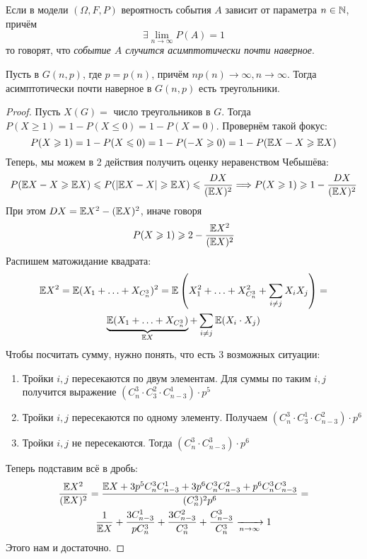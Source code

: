 \begin{definition}
	Если в модели $(\Omega, F, P)$ вероятность события $A$ зависит от параметра $n \in \mathbb{N}$, причём
	\[
		\exists \lim_{n \to \infty} P(A) = 1
	\]
	то говорят, что \textit{событие $A$ случится асимптотически почти наверное}.
\end{definition}

\begin{theorem}
	Пусть в $G(n, p)$, где $p = p(n)$, причём $np(n) \to \infty, n \to \infty$. Тогда асимптотически почти наверное в $G(n, p)$ есть треугольники.
\end{theorem}

\begin{proof}
	Пусть $X(G) = $ число треугольников в $G$. Тогда $P(X \ge 1) = 1 - P(X \le 0) = 1 - P(X = 0)$.  Провернём такой фокус:
	\[
		P(X \geqslant 1) = 1 - P(X \leqslant 0) = 1 - P(-X \geqslant 0) = 1 - P(\mathbb{E} X - X \geqslant \mathbb{E} X)
	\]
	Теперь, мы можем в 2 действия получить оценку неравенством Чебышёва:
	\[
		P(\mathbb{E} X - X \geqslant \mathbb{E} X) \leqslant P(|\mathbb{E} X - X| \geqslant \mathbb{E} X) \leqslant \frac{DX}{(\mathbb{E} X)^2} \Longrightarrow P(X \geqslant 1) \geqslant 1 - \frac{DX}{(\mathbb{E} X)^2}
	\]
	При этом $DX = \mathbb{E} X^2 - (\mathbb{E} X)^2$, иначе говоря
	\[
		P(X \geqslant 1) \geqslant 2 - \frac{\mathbb{E} X^2}{(\mathbb{E} X)^2}
	\]
	Распишем матожидание квадрата:
	\begin{multline*}
		\mathbb{E} X^2 = \mathbb{E} (X_1 + \ldots + X_{C_n^3})^2 = \mathbb{E}\left(X_1^2 + \ldots + X_{C_n^3}^2 + \sum_{i \neq j} X_i X_j\right) =
		\\
		\underbrace{\mathbb{E}(X_1 + \ldots + X_{C_n^3})}_{\mathbb{E} X} + \sum_{i \neq j} \mathbb{E}(X_i \cdot X_j)
	\end{multline*}
	Чтобы посчитать сумму, нужно понять, что есть 3 возможных ситуации:
	\begin{enumerate}
		\item Тройки $i, j$ пересекаются по двум элементам. Для суммы по таким $i, j$ получится выражение $(C_n^3 \cdot C_3^2 \cdot C_{n - 3}^1) \cdot p^5$
		
		\item Тройки $i, j$ пересекаются по одному элементу. Получаем $(C_n^3 \cdot C_3^1 \cdot C_{n - 3}^2) \cdot p^6$
		
		\item Тройки $i, j$ не пересекаются. Тогда $(C_n^3 \cdot C_{n - 3}^3) \cdot p^6$
	\end{enumerate}
	Теперь подставим всё в дробь:
	\begin{multline*}
		\frac{\mathbb{E} X^2}{(\mathbb{E} X)^2} = \frac{\mathbb{E} X + 3p^5 C_n^3 C_{n - 3}^1 + 3p^6 C_n^3 C_{n - 3}^2 + p^6 C_n^3 C_{n - 3}^3}{(C_n^3)^2 p^6} =
		\\
		\frac{1}{\mathbb{E} X} + \frac{3C_{n - 3}^1}{pC_n^3} + \frac{3C_{n - 3}^2}{C_n^3} + \frac{C_{n - 3}^3}{C_n^3} \xrightarrow[n \to \infty]{} 1
	\end{multline*}
	Этого нам и достаточно.
\end{proof}

